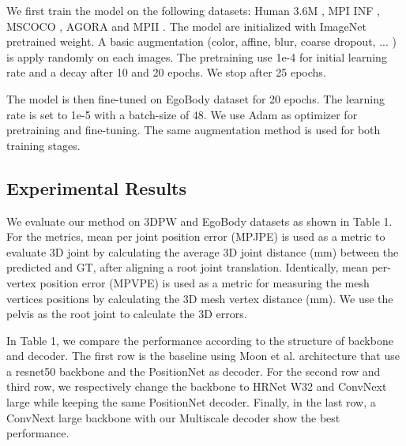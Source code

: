 \documentclass[runningheads]{llncs}
\begin{document}
We first train the model on the following datasets: Human 3.6M \cite{h36m_pami}, MPI INF \cite{mono-3dhp2017}, MSCOCO \cite{mscoco}, AGORA \cite{Patel:CVPR:2021} and MPII \cite{andriluka14cvpr}. The model are initialized with ImageNet pretrained weight.
A basic augmentation (color, affine, blur, coarse dropout, ... ) is apply randomly on each images.
The pretraining use 1e-4 for initial learning rate and a decay after 10 and 20 epochs. We stop after 25 epochs.

The model is then fine-tuned on EgoBody \cite{Zhang:ECCV:2022} dataset for 20 epochs. The learning rate is set to 1e-5 with a batch-size of 48. We use Adam as optimizer for pretraining and fine-tuning. The same augmentation method is used for both training stages.





\subsection{Experimental Results}


We evaluate our method on 3DPW \cite{vonMarcard2018} and EgoBody \cite{Zhang:ECCV:2022} datasets as shown in Table 1.
For the metrics, mean per joint position error (MPJPE) is used as a metric to evaluate 3D joint by calculating the average 3D joint distance (mm) between the predicted and GT, after aligning a root joint translation. Identically, mean per-vertex position error (MPVPE) is used as a metric for measuring the mesh vertices positions by calculating the 3D mesh vertex distance (mm). We use the pelvis as the root joint to calculate the 3D errors.

In Table 1, we compare the performance according to the structure of backbone and decoder. 
The first row is the baseline using Moon et al. \cite{Moon_2022_CVPRW_Hand4Whole} architecture that use a resnet50 \cite{resnet} backbone and the PositionNet as decoder. For the second row and third row, we respectively change the backbone to HRNet W32 \cite{hrnet} and ConvNext \cite{liu2022convnet} large while keeping the same PositionNet decoder.
Finally, in the last row, a ConvNext \cite{liu2022convnet} large backbone with our Multiscale decoder show the best performance.
\end{document}

